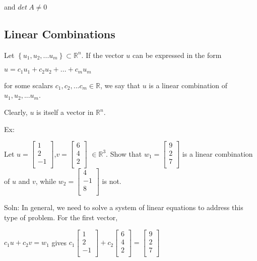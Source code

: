 \documentclass{extarticle}
\begin{document}
and $det\ A\neq0$

\subsection{Linear Combinations}
Let $\left\{u_1,u_2,... u_m\right\}\subset{\mathbb{R}}^n$. If the vector $u$ can be expressed in the form

$u = c_1u_1+c_2u_2+...+ c_mu_m$

for some scalars $c_1,c_2,... c_m\in\mathbb{R}$, we say that $u$ is a linear combination of $u_1,u_2,... u_m$.

Clearly, $u$ is itself a vector in ${\mathbb{R}}^n$.

\begin{tcolorbox}[enhanced jigsaw,sharp corners,coltext=black,colback=BurntOrange!25!white,boxrule=0pt,breakable,size=minimal]

Ex: 

Let 
$u=\left[\begin{matrix}1\\2\\-1\\\end{matrix}\right]$,$v=\left[\begin{matrix}6\\4\\2\\\end{matrix}\right]$ $\in{\mathbb{R}}^3$.
Show that
$w_1=\left[\begin{matrix}9\\2\\7\\\end{matrix}\right]$
is a linear combination of $u$ and $v$, while $w_2=\left[\begin{matrix}4\\-1\\8\\\end{matrix}\right]$ is not.



Soln: In general, we need to solve a system of linear equations to address this type of problem. For the first vector,


$c_1u+c_2v=w_1$ gives 
$c_1\left[\begin{matrix}1\\2\\-1\\\end{matrix}\right]+c_2\left[\begin{matrix}6\\4\\2\\\end{matrix}\right]=\left[\begin{matrix}9\\2\\7\\\end{matrix}\right]$


\end{tcolorbox}
\end{document}
